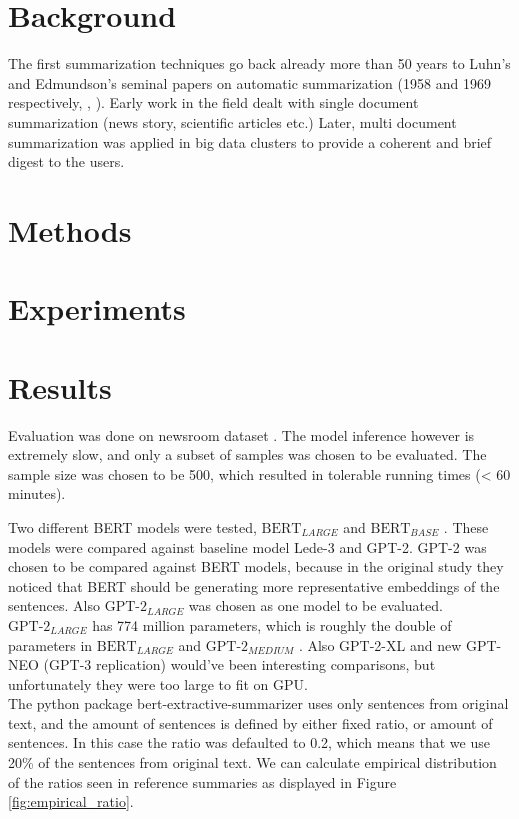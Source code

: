 \documentclass{article}
\newcommand{\bertlarge}{$\text{BERT}_{LARGE}$ }
\newcommand{\bertbase}{$\text{BERT}_{BASE}$ }
\newcommand{\gptmedium}{$\text{GPT-2}_{MEDIUM}$ }
\newcommand{\gptlarge}{$\text{GPT-2}_{LARGE}$ }
\begin{document}
\section{Background}
The first summarization techniques go back already more than 50 years to Luhn’s and Edmundson’s seminal papers on automatic summarization (1958 and 1969 respectively, \cite{textmining1958}, \cite{automaticextracting}). Early work in the field dealt with single document summarization (news story, scientific articles etc.) Later, multi document summarization was applied in big data clusters to provide a coherent and brief digest to the users. \\



\section{Methods}


\section{Experiments}


\section{Results}

Evaluation was done on newsroom dataset \cite{dataset}. The model inference however is extremely slow, and only a subset of samples was chosen to be evaluated. The sample size was chosen to be 500, which resulted in tolerable running times (< 60 minutes). 

\noindent
Two different BERT models were tested, \bertlarge and \bertbase. These models were compared against baseline model Lede-3 and GPT-2. GPT-2 was chosen to be compared against BERT models, because in the original study \cite{extractive_bert} they noticed that BERT should be generating more representative embeddings of the sentences. Also \gptlarge was chosen as one model to be evaluated. \gptlarge has 774 million parameters, which is roughly the double of parameters in \bertlarge and \gptmedium. Also GPT-2-XL and new GPT-NEO (GPT-3 replication) would've been interesting comparisons, but unfortunately they were too large to fit on GPU.\\

\noindent
The python package bert-extractive-summarizer \cite{extractive_bert} uses only sentences from original text, and the amount of sentences is defined by either fixed ratio, or amount of sentences. In this case the ratio was defaulted to 0.2, which means that we use 20\% of the sentences from original text. We can calculate empirical distribution of the ratios seen in reference summaries as displayed in Figure \ref{fig:empirical_ratio}.
\end{document}
